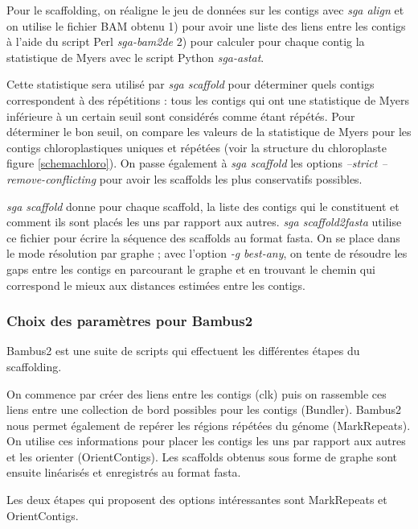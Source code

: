 \documentclass[a4paper]{article}
\begin{document}
Pour le scaffolding, on réaligne le jeu de données sur les contigs avec \textit{sga align} et on utilise le fichier BAM obtenu 1)
pour avoir une liste des liens entre les contigs à l'aide du script Perl \textit{sga-bam2de} 2) pour calculer pour chaque contig la statistique de Myers avec le script Python \textit{sga-astat}. 

Cette statistique sera utilisé par \textit{sga scaffold} pour déterminer quels contigs correspondent à des répétitions : tous les contigs qui ont une statistique de Myers inférieure à un certain seuil sont considérés comme étant répétés. Pour déterminer le bon seuil, on compare les valeurs de la statistique de Myers pour les contigs chloroplastiques uniques et répétées (voir la structure du chloroplaste figure \ref{schemachloro}). On passe également à \textit{sga scaffold} les options \textit{--strict --remove-conflicting} pour avoir les scaffolds les plus conservatifs possibles. 

\textit{sga scaffold} donne pour chaque scaffold, la liste des contigs qui le constituent et comment ils sont placés les uns par rapport aux autres. \textit{sga scaffold2fasta} utilise ce fichier pour écrire la séquence des scaffolds au format fasta. On se place dans le mode résolution par graphe ; avec l'option \textit{-g best-any}, on tente de résoudre les gaps entre les contigs en parcourant le graphe et en trouvant le chemin qui correspond le mieux aux distances estimées entre les contigs. 

\subsubsection{Choix des paramètres pour Bambus2}

Bambus2 est une suite de scripts qui effectuent les différentes étapes du scaffolding. 

On commence par créer des liens entre les contigs (clk) puis on rassemble ces liens entre une collection de bord possibles pour les contigs (Bundler). Bambus2 nous permet également de repérer les régions répétées du génome (MarkRepeats). On  utilise ces informations pour placer les contigs les uns par rapport aux autres et les orienter (OrientContigs). Les scaffolds obtenus sous forme de graphe sont ensuite linéarisés et enregistrés au format fasta.  

Les deux étapes qui proposent des options intéressantes sont MarkRepeats et OrientContigs. 

\end{document}
